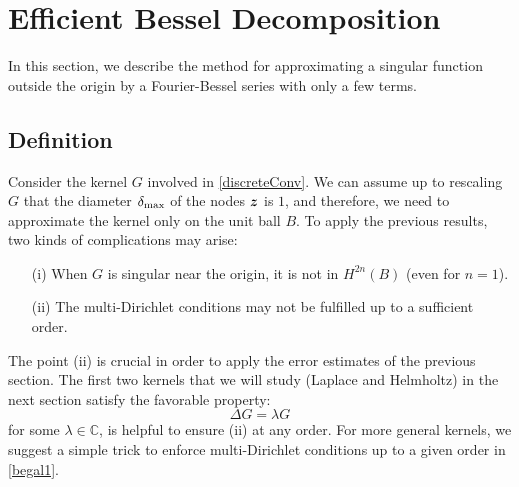 \documentclass[smallextended]{svjour3}
\begin{document}
\section{Efficient Bessel Decomposition}
\label{sec:EBD}		
In this section, we describe the method for approximating a singular function outside the origin by a Fourier-Bessel series with only a few terms. 
\subsection{Definition}
\label{sub:defEBD}					
Consider the kernel $G$ involved in \eqref{discreteConv}. We can assume up to rescaling $G$ that the diameter $\delta_{\max}$ of the nodes $\boldsymbol{z}$ is $1$, and therefore, we need to approximate the kernel only on the unit ball $B$. To apply the previous results, two kinds of complications may arise:
\begin{itemize}
	\item[(i)] When $G$ is singular near the origin, it is not in $H^{2n}(B)$ (even for $n=1$). 
	\item[(ii)] The multi-Dirichlet conditions may not be fulfilled up to a sufficient order.
\end{itemize}
			
The point (ii) is crucial in order to apply the error estimates of the previous section. The first two kernels that we will study (Laplace and Helmholtz) in the next section satisfy the favorable property:
\[\Delta G = \lambda G\]
for some $\lambda \in \mathbb{C}$, is helpful to ensure (ii) at any order. For more general kernels, we suggest a simple trick to enforce multi-Dirichlet conditions up to a given order in \autoref{begal1}. 
			
\end{document}
